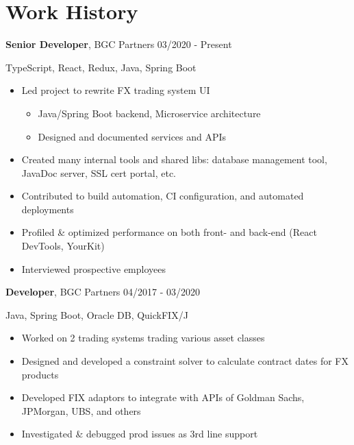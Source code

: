 \documentclass{article}
\begin{document}
\hspace{0.5cm}
\begin{minipage}[t]{0.35\linewidth}
\section*{Work History}
\textbf{Senior Developer}, BGC Partners \hfill 03/2020 - Present

\vspace{0.3cm}TypeScript, React, Redux, Java, Spring Boot

\vspace{0.3cm}
\begin{itemize}
  \item Led project to rewrite FX trading system UI
    \begin{itemize}
      \item Java/Spring Boot backend, Microservice architecture
      \item Designed and documented services and APIs
    \end{itemize}
  \item Created many internal tools and shared libs: database management tool, JavaDoc server, SSL cert portal, etc.
  \item Contributed to build automation, CI configuration, and automated deployments
  \item Profiled \& optimized performance on both front- and back-end (React DevTools, YourKit)
  \item Interviewed prospective employees
\end{itemize}

\vspace{0.3cm}
\textbf{Developer}, BGC Partners \hfill 04/2017 - 03/2020

\vspace{0.3cm}
Java, Spring Boot, Oracle DB, QuickFIX/J

\vspace{0.3cm}
\begin{itemize}
  \item Worked on 2 trading systems trading various asset classes
  \item Designed and developed a constraint solver to calculate contract dates for FX products
  \item Developed FIX adaptors to integrate with APIs of Goldman Sachs, JPMorgan, UBS, and others
  \item Investigated \& debugged prod issues as 3rd line support
\end{itemize}


\end{minipage}
\end{document}
